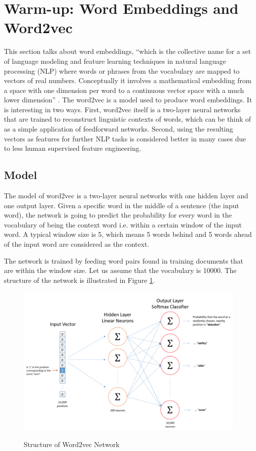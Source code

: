 \documentclass[11pt]{article}
\theoremstyle{plain}
\begin{document}
\section{Warm-up: Word Embeddings and Word2vec}
\label{s:w2v}
This section talks about word embeddings, ``which is the collective name for 
a set of language modeling and feature learning techniques in natural 
language processing (NLP) where words or phrases from the vocabulary are 
mapped to vectors of real numbers. Conceptually it involves a mathematical 
embedding from a space with one dimension per word to a continuous vector 
space with a much lower dimension'' \cite{wiki-wordembedding}. The 
word2vec is a model used to produce word embeddings. It is interesting in 
two ways. First, word2vec itself is a two-layer neural networks that are 
trained to reconstruct linguistic contexts of words, which can be think of as 
a simple application of feedforward networks. Second, using the resulting 
vectors as features for further NLP tasks is considered better in many cases 
due to less human supervised feature engineering. 

\subsection{Model}
The model of word2vec is a two-layer neural networks with one hidden layer 
and one output layer. Given a specific word in the middle of a sentence (the 
input word), the network is going to predict the probability for every word in 
the vocabulary of being the context word i.e. within a certain window of the 
input word. A typical window size is 5, which means 5 words behind and 5 
words ahead of the input word are considered as the context.

The network is trained by feeding word pairs found in training documents 
that are within the window size. Let us assume that the vocabulary is 10000. 
The structure of the network is illustrated in 
Figure \ref{fg:w2v-structure}. 

\begin{figure}[!ht]
	\centering\includegraphics[width=\columnwidth]{images/w2v-structure.png}
	\caption{Structure of Word2vec Network
		}\label{fg:w2v-structure}\cite{w2v-tutorial}
\end{figure}
\end{document}
